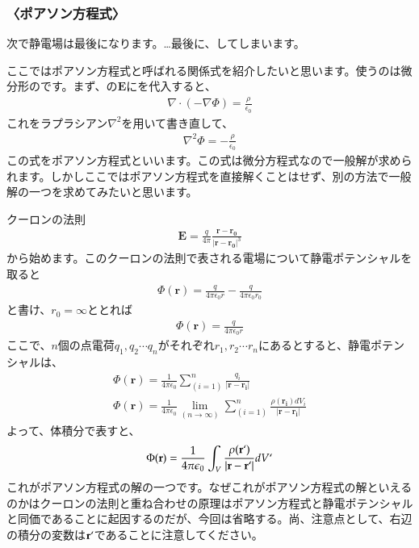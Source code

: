 \documentclass[10pt,b5paper,papersize,dvipdfmx]{jsbook}
\begin{document}
\subsubsection{〈ポアソン方程式〉}
次で静電場は最後になります。…最後に、してしまいます。\par
ここではポアソン方程式と呼ばれる関係式を紹介したいと思います。使うのは微分形のです。まず、の$\mathbf{E}$にを代入すると、
\begin{align}
\nabla\cdot(-\nabla\Phi ) =  \frac{\rho}{\epsilon_0}
\end{align}
これをラプラシアン$\nabla^2$を用いて書き直して、
\begin{align}
\nabla^2 \Phi = - \frac{\rho}{\epsilon_0}
\end{align}
この式をポアソン方程式といいます。この式は微分方程式なので一般解が求められます。しかしここではポアソン方程式を直接解くことはせず、別の方法で一般解の一つを求めてみたいと思います。\par
クーロンの法則
\begin{align}
\mathbf{E} = \frac{q}{4\pi}\frac{\mathbf{r}-\mathbf{r_0}}{|\mathbf{r}-\mathbf{r_0}|^3}
\end{align}
から始めます。このクーロンの法則で表される電場について静電ポテンシャルを取ると
\begin{align}
\Phi(\mathbf{r}) = \frac{q}{4\pi\epsilon_0 r}-\frac{q}{4\pi\epsilon_0 r_0}
\end{align}
と書け、$r_0 = \infty$ととれば
\begin{align}
\Phi(\mathbf{r}) = \frac{q}{4\pi\epsilon_0 r}
\end{align}
ここで、$n$個の点電荷$q_1,q_2\cdots q_n$がそれぞれ$r_1,r_2\cdots r_n$にあるとすると、静電ポテンシャルは、
\begin{align}
\Phi(\mathbf{r}) = \frac{1}{4\pi\epsilon_0}\sum_(i=1)^n \frac{q_i}{|\mathbf{r}-\mathbf{r_i}|} \\
\Phi(\mathbf{r}) = \frac{1}{4\pi\epsilon_0}\lim_(n \to \infty)\sum_(i=1)^n \frac{\rho(\mathbf{r_i}) dV_i}{|\mathbf{r}-\mathbf{r_i}|}
\end{align}
よって、体積分で表すと、
\begin{align}
\Phi(\mathbf{r}) = \frac{1}{4\pi\epsilon_0}\int_V \frac{\rho(\mathbf{r`})}{|\mathbf{r}-\mathbf{r`}|}dV`
\end{align}
これがポアソン方程式の解の一つです。なぜこれがポアソン方程式の解といえるのかはクーロンの法則と重ね合わせの原理はポアソン方程式と静電ポテンシャルと同価であることに起因するのだが、今回は省略する。尚、注意点として、右辺の積分の変数は$\mathbf{r`}$であることに注意してください。
\end{document}
